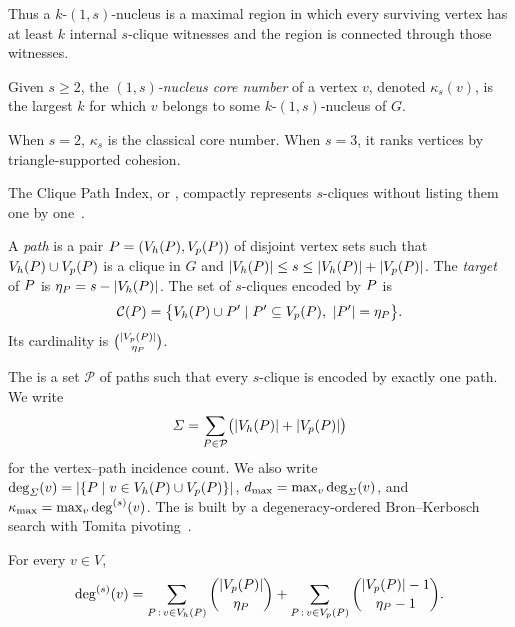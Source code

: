 Thus a \(k\)-\((1,s)\)-nucleus is a maximal region in which every surviving vertex has at least \(k\) internal \(s\)-clique witnesses and the region is connected through those witnesses.

\begin{definition}\label{def:core}
Given \(s\ge2\), the \emph{\((1,s)\)-nucleus core number} of a vertex \(v\), denoted \(\kappa_s(v)\), is the largest \(k\) for which \(v\) belongs to some \(k\)-\((1,s)\)-nucleus of \(G\).
\end{definition}

When \(s=2\), \(\kappa_s\) is the classical core number.
%
When \(s=3\), it ranks vertices by triangle-supported cohesion.

\label{sec:prelim-cpi}
The Clique Path Index, or \cpi{}, compactly represents \(s\)-cliques without listing them one by one~\cite{NuclearCD}.

\begin{definition}\label{def:path}
A \emph{\cpi{} path} is a pair \(\TPath=(\Vh(\TPath),\Vp(\TPath))\) of disjoint vertex sets such that \(\Vh(\TPath)\cup\Vp(\TPath)\) is a clique in \(G\) and \(|\Vh(\TPath)|\le s\le|\Vh(\TPath)|+|\Vp(\TPath)|\).
The \emph{target} of \(\TPath\) is \(\eta_{\TPath}=s-|\Vh(\TPath)|\).
The set of \(s\)-cliques encoded by \(\TPath\) is
\[
  \mathcal{C}(\TPath)
  =
  \bigl\{\Vh(\TPath)\cup P'\mid P'\subseteq\Vp(\TPath),\ |P'|=\eta_{\TPath}\bigr\}.
\]
Its cardinality is \(\binom{|\Vp(\TPath)|}{\eta_{\TPath}}\).
\end{definition}

The \cpi{} is a set \(\mathcal{P}\) of paths such that every \(s\)-clique is encoded by exactly one path.
%
We write
\[
  \Sig=\sum_{\TPath\in\mathcal{P}}\bigl(|\Vh(\TPath)|+|\Vp(\TPath)|\bigr)
\]
for the vertex--path incidence count.
%
We also write \(\deg_{\Sig}(v)=|\{\TPath\mid v\in\Vh(\TPath)\cup\Vp(\TPath)\}|\), \(d_{\max}=\max_v\deg_{\varSigma}(v)\), and \(\kappa_{\max}=\max_v\deg^{(s)}(v)\).
%
The \cpi{} is built by a degeneracy-ordered Bron--Kerbosch search with Tomita pivoting~\cite{NuclearCD,BronKerbosch,eppstein,tomita}.

\begin{lemma}\label{lem:supp}
For every \(v\in V\),
\[
  \sdeg(v)
  =
  \sum_{\TPath\,:\,v\in\Vh(\TPath)}\binom{|\Vp(\TPath)|}{\eta_{\TPath}}
  +
  \sum_{\TPath\,:\,v\in\Vp(\TPath)}\binom{|\Vp(\TPath)|-1}{\eta_{\TPath}-1}.
\]
\end{lemma}

